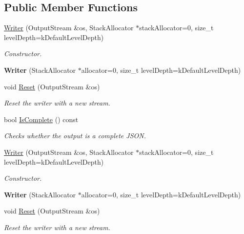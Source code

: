 \subsection*{Public Member Functions}
\begin{DoxyCompactItemize}
\item 
\hyperlink{classWriter_a27998a2e0fcb0aa23c95e1330b340abc}{Writer} (Output\+Stream \&os, Stack\+Allocator $\ast$stack\+Allocator=0, size\+\_\+t level\+Depth=k\+Default\+Level\+Depth)
\begin{DoxyCompactList}\small\item\em Constructor. \end{DoxyCompactList}\item 
\mbox{\label{classWriter_a2a6c946bc2a9dcfdda9f958c3cfee66c}} 
{\bfseries Writer} (Stack\+Allocator $\ast$allocator=0, size\+\_\+t level\+Depth=k\+Default\+Level\+Depth)
\item 
void \hyperlink{classWriter_a4e5bd5e6364edca476125b511b3dca9c}{Reset} (Output\+Stream \&os)
\begin{DoxyCompactList}\small\item\em Reset the writer with a new stream. \end{DoxyCompactList}\item 
bool \hyperlink{classWriter_a3afe8548b06b9f9601f59fbc0687c79b}{Is\+Complete} () const
\begin{DoxyCompactList}\small\item\em Checks whether the output is a complete J\+S\+ON. \end{DoxyCompactList}\item 
\hyperlink{classWriter_a27998a2e0fcb0aa23c95e1330b340abc}{Writer} (Output\+Stream \&os, Stack\+Allocator $\ast$stack\+Allocator=0, size\+\_\+t level\+Depth=k\+Default\+Level\+Depth)
\begin{DoxyCompactList}\small\item\em Constructor. \end{DoxyCompactList}\item 
\mbox{\label{classWriter_a2a6c946bc2a9dcfdda9f958c3cfee66c}} 
{\bfseries Writer} (Stack\+Allocator $\ast$allocator=0, size\+\_\+t level\+Depth=k\+Default\+Level\+Depth)
\item 
void \hyperlink{classWriter_a4e5bd5e6364edca476125b511b3dca9c}{Reset} (Output\+Stream \&os)
\begin{DoxyCompactList}\small\item\em Reset the writer with a new stream. \end{DoxyCompactList}\item 

\end{DoxyCompactItemize}

